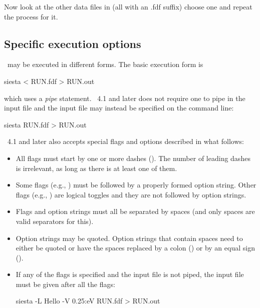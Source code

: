 Now look at the other data files in 
(all with an .fdf suffix) choose one and repeat the process for it.

\subsection{Specific execution options}

\siesta\ may be executed in different forms. The basic execution form
is
\begin{shellexample}
  siesta < RUN.fdf > RUN.out
\end{shellexample}
which uses a \emph{pipe} statement. 
%
\siesta\ 4.1 and later does not require one to pipe in the input file
and the input file may instead be specified on the command line:
\begin{shellexample}
  siesta RUN.fdf > RUN.out
\end{shellexample}
\siesta\ 4.1 and later also accepts special flags and options
described in what follows:
\begin{itemize}
\item
All flags must start by one or more dashes (\shell{-}).
The number of leading dashes is irrelevant,
as long as there is at least one of them.
\item
Some flags (e.g., \shell[-L])
must be followed by a properly formed option string.
Other flags (e.g., \shell[-elec])
are logical toggles and they are not followed by option strings.
\item
Flags and option strings must all be separated by spaces
(and only spaces are valid separators for this).
\item
Option strings may be quoted.
Option strings that contain spaces need to either be quoted
or have the spaces replaced by a colon (\shell{:}) or by
an equal sign (\shell{=}).
\item
If any of the flags is specified and the input file is not piped,
the input file must be given after all the flags:
\begin{shellexample}
  siesta -L Hello -V 0.25:eV RUN.fdf > RUN.out
\end{shellexample}
\end{itemize}

